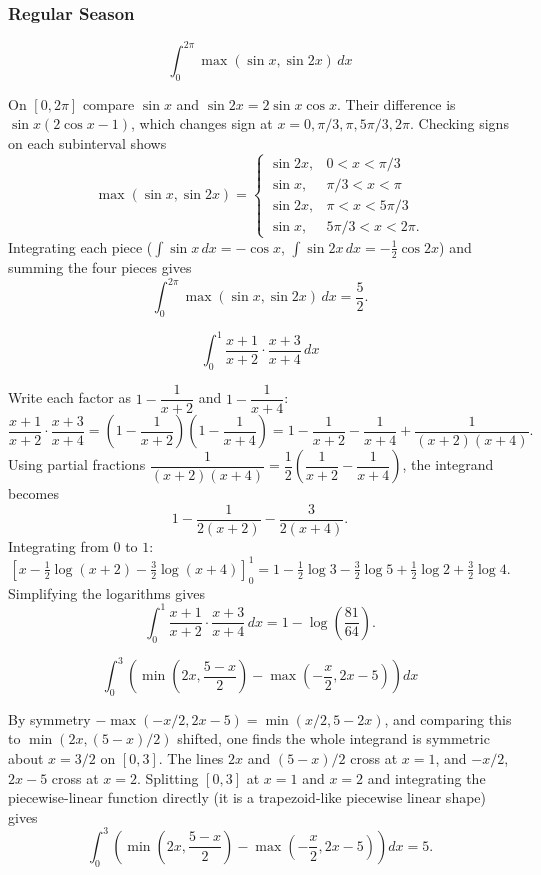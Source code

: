 \subsubsection*{Regular Season}
\begin{questions}

\question \[\int_0^{2\pi} \max(\sin x,\sin 2x)\,dx\]
\begin{solution}
On $[0,2\pi]$ compare $\sin x$ and $\sin 2x=2\sin x\cos x$. Their difference is $\sin x(2\cos x-1)$, which changes sign at $x=0,\pi/3,\pi,5\pi/3,2\pi$. Checking signs on each subinterval shows
\[\max(\sin x,\sin2x)=\begin{cases}\sin2x,&0<x<\pi/3\\ \sin x,&\pi/3<x<\pi\\ \sin2x,&\pi<x<5\pi/3\\ \sin x,&5\pi/3<x<2\pi.\end{cases}\]
Integrating each piece ($\int\sin x\,dx=-\cos x$, $\int\sin2x\,dx=-\tfrac12\cos2x$) and summing the four pieces gives
\[\int_0^{2\pi}\max(\sin x,\sin2x)\,dx=\frac52.\]
\end{solution}

\question \[\int_0^1 \frac{x+1}{x+2}\cdot\frac{x+3}{x+4}\,dx\]
\begin{solution}
Write each factor as $1-\dfrac{1}{x+2}$ and $1-\dfrac{1}{x+4}$:
\[\frac{x+1}{x+2}\cdot\frac{x+3}{x+4}=\left(1-\frac1{x+2}\right)\left(1-\frac1{x+4}\right)=1-\frac1{x+2}-\frac1{x+4}+\frac1{(x+2)(x+4)}.\]
Using partial fractions $\dfrac1{(x+2)(x+4)}=\dfrac12\left(\dfrac1{x+2}-\dfrac1{x+4}\right)$, the integrand becomes
\[1-\frac1{2(x+2)}-\frac{3}{2(x+4)}.\]
Integrating from $0$ to $1$:
\[\left[x-\tfrac12\log(x+2)-\tfrac32\log(x+4)\right]_0^1=1-\tfrac12\log3-\tfrac32\log5+\tfrac12\log2+\tfrac32\log4.\]
Simplifying the logarithms gives
\[\int_0^1\frac{x+1}{x+2}\cdot\frac{x+3}{x+4}\,dx=1-\log\!\left(\frac{81}{64}\right).\]
\end{solution}

\question \[\int_0^3\left(\min\!\left(2x,\frac{5-x}{2}\right)-\max\!\left(-\frac{x}{2},2x-5\right)\right)dx\]
\begin{solution}
By symmetry $-\max(-x/2,2x-5)=\min(x/2,5-2x)$, and comparing this to $\min(2x,(5-x)/2)$ shifted, one finds the whole integrand is symmetric about $x=3/2$ on $[0,3]$. The lines $2x$ and $(5-x)/2$ cross at $x=1$, and $-x/2$, $2x-5$ cross at $x=2$. Splitting $[0,3]$ at $x=1$ and $x=2$ and integrating the piecewise-linear function directly (it is a trapezoid-like piecewise linear shape) gives
\[\int_0^3\left(\min\!\left(2x,\frac{5-x}{2}\right)-\max\!\left(-\frac{x}{2},2x-5\right)\right)dx=5.\]
\end{solution}


\end{questions}
